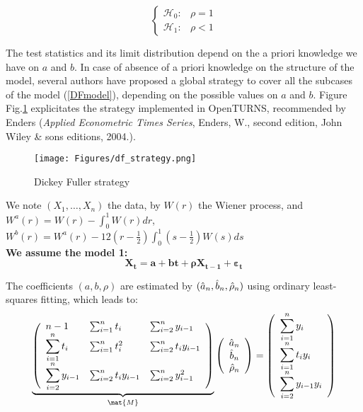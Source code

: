 \begin{equation}\label{DFFormalHypothesis}
  \left\{
  \begin{array}{lr}
    \mathcal{H}_0 : & \rho = 1 \\
    \mathcal{H}_1 : & \rho < 1
  \end{array}
  \right.
\end{equation}

The test statistics and its limit distribution depend on the a priori knowledge we have on $a$ and $b$. In case of absence of a priori knowledge on the structure of the model, several authors have proposed a global strategy to cover all the subcases of the  model (\ref{DFmodel}), depending on the possible values on $a$ and $b$. Figure Fig.\ref{df_strategy} explicitates the strategy  implemented in OpenTURNS,  recommended by Enders (\emph{Applied Econometric Times Series}, Enders, W., second edition, John Wiley \& sons editions, 2004.).



\begin{figure}[H]
  \begin{center}
    \texttt{[image: Figures/df\_strategy.png]}
    \caption{Dickey Fuller strategy}
    \label{df_strategy}
  \end{center}
\end{figure}

We note $(X_1, \hdots, X_n)$ the data, by $W(r)$ the Wiener process, and $W^{a}(r) = W(r) - \int_{0}^{1} W(r) dr$, $W^{b}(r) = W^{a}(r) - 12 \left(r - \frac{1}{2} \right) \int_{0}^{1} \left(s - \frac{1}{2} \right) W(s) ds$\\

{\bf We assume the model 1:}
\begin{equation}\label{Model1}
  \boldsymbol{X_t = a + bt + \rho  X_{t-1} + \varepsilon_{t}}
\end{equation}


The coefficients $(a,b,\rho)$ are estimated by $(\Hat{a}_n, \Hat{b}_n, \Hat{\rho}_n)$ using ordinary least-squares fitting, which leads to:
\begin{equation}\label{Model1Estim}
  \underbrace{\left(\begin{array}{lll}
      \displaystyle n-1 &\sum_{i=1}^n t_{i} &\sum_{i=2}^n y_{i-1}\\
      \displaystyle \sum_{i=1}^n t_{i} &\sum_{i=1}^n t_{i}^2 &\sum_{i=2}^n t_{i} y_{i-1}\\
      \displaystyle \sum_{i=2}^n y_{i-1}& \sum_{i=2}^n t_{i}y_{i-1} &\sum_{i=2}^n y_{i-1}^2
    \end{array}
    \right)}_{\mat{M}}
  \left(\begin{array}{c}
    \hat{a}_n\\
    \hat{b}_n\\
    \hat{\rho}_n
  \end{array}
  \right)=
  \left(
  \begin{array}{l}
    \displaystyle \sum_{i=1}^n y_{i} \\
    \displaystyle \sum_{i=1}^n t_{i}  y_{i}\\
    \displaystyle \sum_{i=2}^n y_{i-1} y_{i}
  \end{array}
  \right)
\end{equation}


